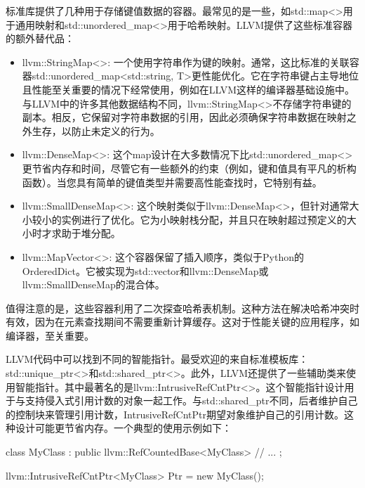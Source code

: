 
标准库提供了几种用于存储键值数据的容器。最常见的是一些，如std::map<>用于通用映射和std::unordered\_map<>用于哈希映射。LLVM提供了这些标准容器的额外替代品：

\begin{itemize}
\item
llvm::StringMap<>: 一个使用字符串作为键的映射。通常，这比标准的关联容器std::unordered\_map<std::string, T>更性能优化。它在字符串键占主导地位且性能至关重要的情况下经常使用，例如在LLVM这样的编译器基础设施中。与LLVM中的许多其他数据结构不同，llvm::StringMap<>不存储字符串键的副本。相反，它保留对字符串数据的引用，因此必须确保字符串数据在映射之外生存，以防止未定义的行为。

\item
llvm::DenseMap<>: 这个map设计在大多数情况下比std::unordered\_map<>更节省内存和时间，尽管它有一些额外的约束（例如，键和值具有平凡的析构函数）。当您具有简单的键值类型并需要高性能查找时，它特别有益。

\item
llvm::SmallDenseMap<>: 这个映射类似于llvm::DenseMap<>，但针对通常大小较小的实例进行了优化。它为小映射栈分配，并且只在映射超过预定义的大小时才求助于堆分配。

\item
llvm::MapVector<>: 这个容器保留了插入顺序，类似于Python的OrderedDict。它被实现为std::vector和llvm::DenseMap或llvm::SmallDenseMap的混合体。
\end{itemize}

值得注意的是，这些容器利用了二次探查哈希表机制。这种方法在解决哈希冲突时有效，因为在元素查找期间不需要重新计算缓存。这对于性能关键的应用程序，如编译器，至关重要。


LLVM代码中可以找到不同的智能指针。最受欢迎的来自标准模板库：std::unique\_ptr<>和std::shared\_ptr<>。此外，LLVM还提供了一些辅助类来使用智能指针。其中最著名的是llvm::IntrusiveRefCntPtr<>。这个智能指针设计用于与支持侵入式引用计数的对象一起工作。与std::shared\_ptr不同，后者维护自己的控制块来管理引用计数，IntrusiveRefCntPtr期望对象维护自己的引用计数。这种设计可能更节省内存。一个典型的使用示例如下：

\begin{cpp}
class MyClass : public llvm::RefCountedBase<MyClass> {
  // ...
};

llvm::IntrusiveRefCntPtr<MyClass> Ptr = new MyClass();
\end{cpp}


